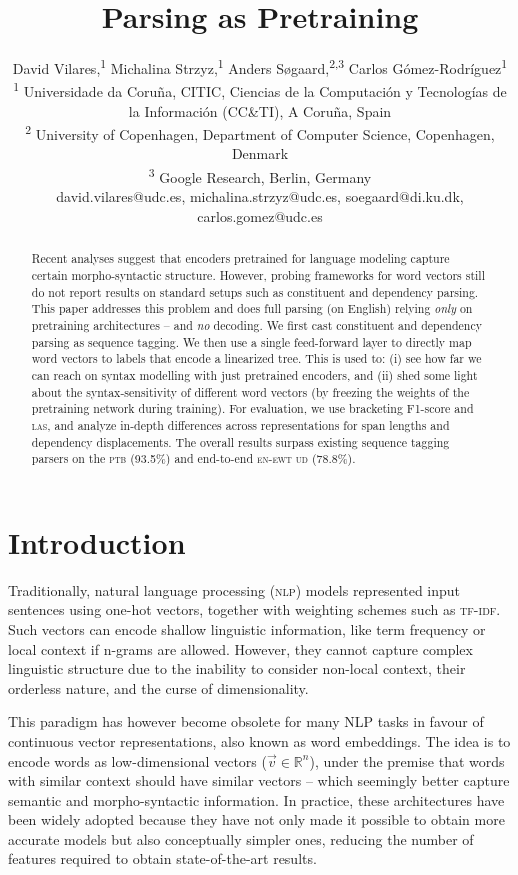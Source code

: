 \documentclass[letterpaper]{article} %
\title{Parsing as Pretraining}
\author{David Vilares,\textsuperscript{\rm 1} Michalina Strzyz,\textsuperscript{\rm 1} Anders S{\o}gaard,\textsuperscript{\rm 2,3} Carlos G{\'o}mez-Rodr{\'i}guez\textsuperscript{\rm 1} \\  %
\textsuperscript{\rm 1} Universidade da Coru{\~n}a, CITIC,  Ciencias de la Computaci{\'o}n y Tecnolog{\'i}as de la Informaci{\'o}n (CC\&TI), A Coru{\~n}a, Spain\\
\textsuperscript{\rm 2} University of Copenhagen, Department of Computer Science, Copenhagen, Denmark\\ \textsuperscript{\rm 3} Google Research, Berlin, Germany\\
david.vilares@udc.es, michalina.strzyz@udc.es, soegaard@di.ku.dk, carlos.gomez@udc.es%
}
\begin{document}
\maketitle

\begin{abstract}

Recent analyses suggest that encoders pretrained for language modeling capture certain morpho-syntactic structure. However, probing frameworks for word vectors still do not report results on standard setups such as constituent and dependency parsing. This paper addresses this problem and does full parsing (on English) relying \emph{only} on pretraining architectures -- and {\em no} decoding. We first cast constituent and dependency parsing as sequence tagging. We then use a single feed-forward layer to directly map word vectors to labels that encode a linearized tree. This is used to: (i) see how far we can reach on syntax modelling with just pretrained encoders, and (ii) shed some light about the syntax-sensitivity of different word vectors (by freezing the weights of the pretraining network during training). For evaluation, we use bracketing F1-score and \textsc{las}, and analyze in-depth differences across representations for span lengths and dependency displacements. The overall results surpass existing sequence tagging parsers on the \textsc{ptb} (93.5\%) and end-to-end \textsc{en-ewt ud} (78.8\%).

\end{abstract}

\section{Introduction}

Traditionally, natural language processing (\textsc{nlp}) models  represented input sentences using one-hot vectors, together with weighting schemes such as \textsc{tf-idf}. Such vectors can encode shallow linguistic information, like term frequency or local context if n-grams are allowed. However, they cannot capture complex linguistic structure due to the inability to consider non-local context, their orderless nature, and the curse of dimensionality.

This paradigm has however become obsolete for many NLP tasks in favour of  continuous vector representations, also known as word embeddings. The idea is to encode words as low-dimensional vectors ($\vec{v} \in \mathbb{R}^n$), under the premise that words with similar context should have similar vectors -- which seemingly better capture semantic and morpho-syntactic information. In practice, these architectures have been widely adopted because they have not only made it possible to obtain more accurate models but also conceptually simpler ones, reducing the number of features required to obtain state-of-the-art results.
\end{document}
